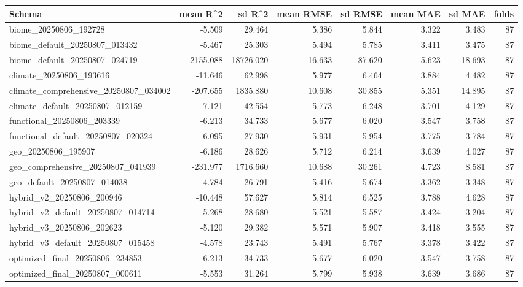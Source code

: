 \begin{tabular}{lrrrrrrr}
\hline Schema & mean R^2 & sd R^2 & mean RMSE & sd RMSE & mean MAE & sd MAE & folds \\ \hline
biome\_20250806\_192728 & -5.509 & 29.464 & 5.386 & 5.844 & 3.322 & 3.483 & 87 \\ 
biome\_default\_20250807\_013432 & -5.467 & 25.303 & 5.494 & 5.785 & 3.411 & 3.475 & 87 \\ 
biome\_default\_20250807\_024719 & -2155.088 & 18726.020 & 16.633 & 87.620 & 5.623 & 18.693 & 87 \\ 
climate\_20250806\_193616 & -11.646 & 62.998 & 5.977 & 6.464 & 3.884 & 4.482 & 87 \\ 
climate\_comprehensive\_20250807\_034002 & -207.655 & 1835.880 & 10.608 & 30.855 & 5.351 & 14.895 & 87 \\ 
climate\_default\_20250807\_012159 & -7.121 & 42.554 & 5.773 & 6.248 & 3.701 & 4.129 & 87 \\ 
functional\_20250806\_203339 & -6.213 & 34.733 & 5.677 & 6.020 & 3.547 & 3.758 & 87 \\ 
functional\_default\_20250807\_020324 & -6.095 & 27.930 & 5.931 & 5.954 & 3.775 & 3.784 & 87 \\ 
geo\_20250806\_195907 & -6.186 & 28.626 & 5.712 & 6.214 & 3.639 & 4.027 & 87 \\ 
geo\_comprehensive\_20250807\_041939 & -231.977 & 1716.660 & 10.688 & 30.261 & 4.723 & 8.581 & 87 \\ 
geo\_default\_20250807\_014038 & -4.784 & 26.791 & 5.416 & 5.674 & 3.362 & 3.348 & 87 \\ 
hybrid\_v2\_20250806\_200946 & -10.448 & 57.627 & 5.814 & 6.525 & 3.788 & 4.628 & 87 \\ 
hybrid\_v2\_default\_20250807\_014714 & -5.268 & 28.680 & 5.521 & 5.587 & 3.424 & 3.204 & 87 \\ 
hybrid\_v3\_20250806\_202623 & -5.120 & 29.382 & 5.571 & 5.907 & 3.418 & 3.555 & 87 \\ 
hybrid\_v3\_default\_20250807\_015458 & -4.578 & 23.743 & 5.491 & 5.767 & 3.378 & 3.422 & 87 \\ 
optimized\_final\_20250806\_234853 & -6.213 & 34.733 & 5.677 & 6.020 & 3.547 & 3.758 & 87 \\ 
optimized\_final\_20250807\_000611 & -5.553 & 31.264 & 5.799 & 5.938 & 3.639 & 3.686 & 87 \\ 
\hline
\end{tabular}
